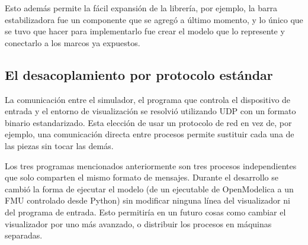Esto además permite la fácil expansión de la librería, por ejemplo, la barra estabilizadora fue un componente que se agregó a último momento, y lo único que se tuvo que hacer para implementarlo fue crear el modelo que lo represente y conectarlo a los marcos ya expuestos.



\subsection*{El desacoplamiento por protocolo estándar}

La comunicación entre el simulador, el programa que controla el dispositivo de entrada y el entorno de visualización se resolvió utilizando UDP con un formato binario estandarizado. Esta elección de usar un protocolo de red en vez de, por ejemplo, una comunicación directa entre procesos permite sustituir cada una de las piezas sin tocar las demás.

Los tres programas mencionados anteriormente son tres procesos independientes que solo comparten el mismo formato de mensajes. Durante el desarrollo se cambió la forma de ejecutar el modelo (de un ejecutable de OpenModelica a un FMU controlado desde Python) sin modificar ninguna línea del visualizador ni del programa de entrada. Esto permitiría en un futuro cosas como cambiar el visualizador por uno más avanzado, o distribuir los procesos en máquinas separadas.


